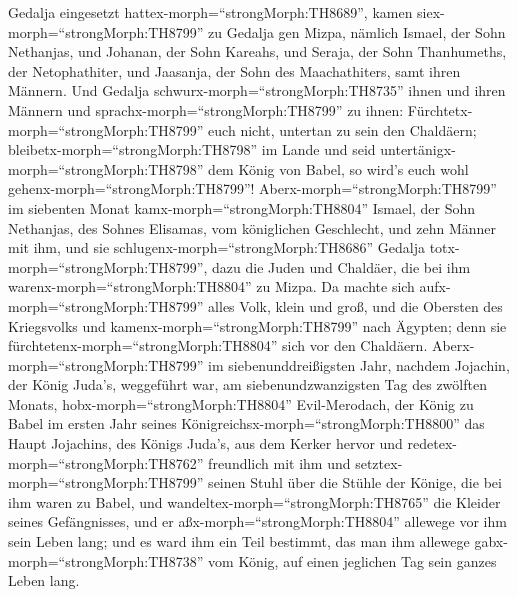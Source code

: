 Gedalja eingesetzt hattex-morph=``strongMorph:TH8689'', kamen
siex-morph=``strongMorph:TH8799'' zu Gedalja gen Mizpa, nämlich Ismael,
der Sohn Nethanjas, und Johanan, der Sohn Kareahs, und Seraja, der Sohn
Thanhumeths, der Netophathiter, und Jaasanja, der Sohn des
Maachathiters, samt ihren Männern.  Und Gedalja
schwurx-morph=``strongMorph:TH8735'' ihnen und ihren Männern und
sprachx-morph=``strongMorph:TH8799'' zu ihnen:
Fürchtetx-morph=``strongMorph:TH8799'' euch nicht, untertan zu sein den
Chaldäern; bleibetx-morph=``strongMorph:TH8798'' im Lande und seid
untertänigx-morph=``strongMorph:TH8798'' dem König von Babel, so wird's
euch wohl gehenx-morph=``strongMorph:TH8799''! 
Aberx-morph=``strongMorph:TH8799'' im siebenten Monat
kamx-morph=``strongMorph:TH8804'' Ismael, der Sohn Nethanjas, des Sohnes
Elisamas, vom königlichen Geschlecht, und zehn Männer mit ihm, und sie
schlugenx-morph=``strongMorph:TH8686'' Gedalja
totx-morph=``strongMorph:TH8799'', dazu die Juden und Chaldäer, die bei
ihm warenx-morph=``strongMorph:TH8804'' zu Mizpa.  Da
machte sich aufx-morph=``strongMorph:TH8799'' alles Volk, klein und
groß, und die Obersten des Kriegsvolks und
kamenx-morph=``strongMorph:TH8799'' nach Ägypten; denn sie
fürchtetenx-morph=``strongMorph:TH8804'' sich vor den Chaldäern.
 Aberx-morph=``strongMorph:TH8799'' im siebenunddreißigsten
Jahr, nachdem Jojachin, der König Juda's, weggeführt war, am
siebenundzwanzigsten Tag des zwölften Monats,
hobx-morph=``strongMorph:TH8804'' Evil-Merodach, der König zu Babel im
ersten Jahr seines Königreichsx-morph=``strongMorph:TH8800'' das Haupt
Jojachins, des Königs Juda's, aus dem Kerker hervor  und
redetex-morph=``strongMorph:TH8762'' freundlich mit ihm und
setztex-morph=``strongMorph:TH8799'' seinen Stuhl über die Stühle der
Könige, die bei ihm waren zu Babel,  und
wandeltex-morph=``strongMorph:TH8765'' die Kleider seines Gefängnisses,
und er aßx-morph=``strongMorph:TH8804'' allewege vor ihm sein Leben
lang;  und es ward ihm ein Teil bestimmt, das man ihm
allewege gabx-morph=``strongMorph:TH8738'' vom König, auf einen
jeglichen Tag sein ganzes Leben lang.
